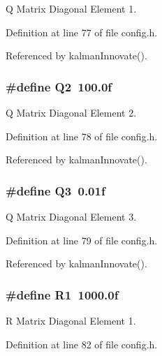 Q Matrix Diagonal Element 1. 



Definition at line 77 of file config.\-h.



Referenced by kalman\-Innovate().

\hypertarget{group__config_gaf5bca4c32f8c6886a3d8c526d2e3e9a7}{
\subsubsection[{Q2}]{\setlength{\rightskip}{0pt plus 5cm}\#define Q2~100.\-0f}}\label{group__config_gaf5bca4c32f8c6886a3d8c526d2e3e9a7}


Q Matrix Diagonal Element 2. 



Definition at line 78 of file config.\-h.



Referenced by kalman\-Innovate().

\hypertarget{group__config_ga1d7d3dfd2c4618949c484c5e8369f05a}{
\subsubsection[{Q3}]{\setlength{\rightskip}{0pt plus 5cm}\#define Q3~0.\-01f}}\label{group__config_ga1d7d3dfd2c4618949c484c5e8369f05a}


Q Matrix Diagonal Element 3. 



Definition at line 79 of file config.\-h.



Referenced by kalman\-Innovate().

\hypertarget{group__config_ga918f64eb53db8e8dc694f36a87646476}{
\subsubsection[{R1}]{\setlength{\rightskip}{0pt plus 5cm}\#define R1~1000.\-0f}}\label{group__config_ga918f64eb53db8e8dc694f36a87646476}


R Matrix Diagonal Element 1. 



Definition at line 82 of file config.\-h.



